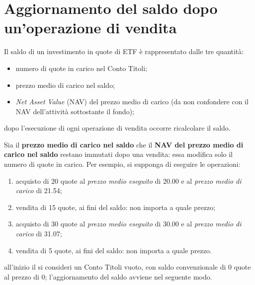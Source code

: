 \documentclass[12pt,a4paper]{article}
\newcommand{\Eur}[1]{\SI{#1}{\text{\euro{}}}}
\begin{document}
\section{Aggiornamento del saldo dopo un'operazione di vendita}


Il saldo di un investimento in quote di ETF è rappresentato dalle tre quantità:
\begin{itemize}
\item numero di quote in carico nel Conto Titoli;
\item prezzo medio di carico nel saldo;
\item \emph{Net Asset Value} (NAV) del prezzo  medio di carico (da non confondere con
  il NAV dell'attività  sottostante il fondo);
\end{itemize}
dopo l'esecuzione di ogni operazione di vendita occorre ricalcolare il saldo.

Sia il \textbf{prezzo medio di carico nel  saldo} che il \textbf{NAV del prezzo medio
   di carico  nel saldo}  restano immutati  dopo una vendita:  essa modifica  solo il
numero di quote in carico.  Per esempio, si supponga di eseguire le operazioni:
\begin{enumerate}
\item acquisto di \num{20} quote al  \emph{prezzo medio eseguito} di \Eur{20,00} e al
  \emph{prezzo medio di carico} di \Eur{21,54};
\item vendita di \num{15} quote, ai fini del saldo: non importa a quale prezzo;
\item acquisto di \num{30} quote al  \emph{prezzo medio eseguito} di \Eur{30,00} e al
  \emph{prezzo medio di carico} di \Eur{31,07};
\item vendita di \num{5} quote, ai fini del saldo: non importa a quale prezzo.
\end{enumerate}
all'inizio il si consideri un Conto  Titoli vuoto, con saldo convenzionale di \num{0}
quote al prezzo di \Eur{0}; l'aggiornamento del saldo avviene nel seguente modo.
\end{document}

